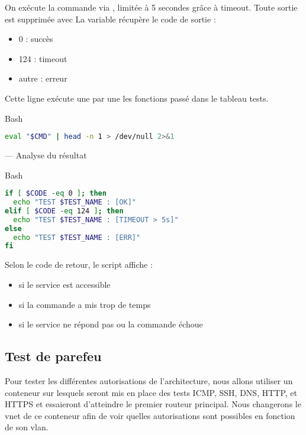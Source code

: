 \documentclass{article}
\begin{document}
On exécute la commande via , limitée à 5 secondes grâce à timeout. Toute sortie est supprimée avec 
La variable  récupère le code de sortie :
\begin{itemize}
\item 0 : succès
\item 124 : timeout
\item autre : erreur
\end{itemize}

Cette ligne exécute une par une les fonctions passé dans le tableau tests.

\begin{codebox}{Bash}
\begin{lstlisting}[language=Bash]
eval "$CMD" | head -n 1 > /dev/null 2>&1
\end{lstlisting}
\end{codebox}

---
Analyse du résultat

\begin{codebox}{Bash}
\begin{lstlisting}[language=Bash]
if [ $CODE -eq 0 ]; then
  echo "TEST $TEST_NAME : [OK]"
elif [ $CODE -eq 124 ]; then
  echo "TEST $TEST_NAME : [TIMEOUT > 5s]"
else
  echo "TEST $TEST_NAME : [ERR]"
fi
\end{lstlisting}
\end{codebox}

Selon le code de retour, le script affiche :

\begin{itemize}
\item \monosp{[OK]} si le service est accessible
\item \monosp{[TIMEOUT > 5s]} si la commande a mis trop de temps
\item \monosp{[ERR]} si le service ne répond pas ou la commande échoue
\end{itemize}

\subsection{Test de parefeu}

Pour tester les différentes autorisations de l'architecture, nous allons utiliser un conteneur sur lesquels seront mis en place des tests ICMP, SSH, DNS, HTTP, et HTTPS et essaieront d'atteindre le premier routeur principal. Nous changerons le vnet de ce conteneur afin de voir quelles autorisations sont possibles en fonction de son vlan.
\end{document}
